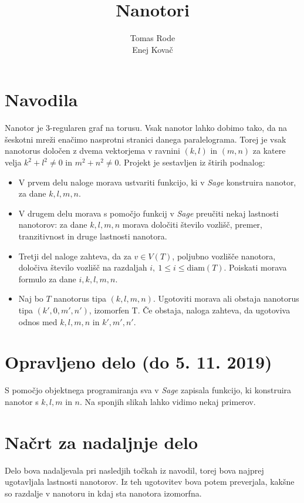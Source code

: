 \documentclass[a4paper, 12 pt]{article}
\title{Nanotori}
\author{Tomas Rode \\ Enej Kovač}
\begin{document}
\maketitle

\section{Navodila}

Nanotor je 3-regularen graf na torusu. Vsak nanotor lahko dobimo tako, da na šeskotni mreži enačimo nasprotni stranici danega paralelograma. Torej je vsak nanotorus določen z dvema vektorjema v ravnini $(k,l)$ in $(m, n)$ za katere velja $k^2 + l^2 \neq 0$ in $m^2 + n^2 \neq 0$. Projekt je sestavljen iz štirih podnalog:

\begin{itemize}
  \item V prvem delu naloge morava ustvariti funkcijo, ki v \textit{Sage} konstruira nanotor, za dane $k, l, m, n$.
  \item V drugem delu morava s pomočjo funkcij v \textit{Sage} preučiti nekaj lastnosti nanotorov: za dane $k, l, m, n$ morava določiti število vozlišč, premer, tranzitivnost in druge lastnosti nanotora.
  \item Tretji del naloge zahteva, da za $v \in V(T)$, poljubno vozlišče nanotora, določiva število vozlišč na razdaljah $i,\ 1 \leq i \leq \text{diam}(T)$. Poiskati morava formulo za dane $i, k, l, m, n$.
  \item Naj bo $T$ nanotorus tipa $(k, l, m, n)$. Ugotoviti morava ali obstaja nanotorus tipa $(k', 0, m', n')$, izomorfen T. Če obstaja, naloga zahteva, da ugotoviva odnos med $k, l, m, n$ in $k', m', n'$.
\end{itemize}

\section{Opravljeno delo (do 5. 11. 2019)}

S pomočjo objektnega programiranja sva v \textit{Sage} zapisala funkcijo, ki konstruira nanotor s $k, l, m$ in $n$. Na sponjih slikah lahko vidimo nekaj primerov.

\section{Načrt za nadaljnje delo}

Delo bova nadaljevala pri nasledjih točkah iz navodil, torej bova najprej ugotavljala lastnosti nanotorov. Iz teh ugotovitev bova potem preverjala, kakšne so razdalje v nanotoru in kdaj sta nanotora izomorfna.
\end{document}
